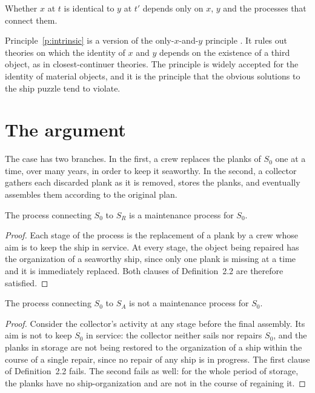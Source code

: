 \documentclass{situationist-preprint}
\begin{document}
\begin{principle}[Intrinsicness]\label{p:intrinsic}
Whether $x$ at $t$ is identical to $y$ at $t'$ depends only on $x$, $y$ and the processes that connect them.
\end{principle}

Principle~\ref{p:intrinsic} is a version of the only-$x$-and-$y$ principle \citep{Wiggins1980,Noonan1985}. It rules out theories on which the identity of $x$ and $y$ depends on the existence of a third object, as in closest-continuer theories. The principle is widely accepted for the identity of material objects, and it is the principle that the obvious solutions to the ship puzzle tend to violate.

\section{The argument}

The case has two branches. In the first, a crew replaces the planks of $S_0$ one at a time, over many years, in order to keep it seaworthy. In the second, a collector gathers each discarded plank as it is removed, stores the planks, and eventually assembles them according to the original plan.

\begin{lemma}\label{l:repair}
The process connecting $S_0$ to $S_R$ is a maintenance process for $S_0$.
\end{lemma}

\begin{proof}
Each stage of the process is the replacement of a plank by a crew whose aim is to keep the ship in service. At every stage, the object being repaired has the organization of a seaworthy ship, since only one plank is missing at a time and it is immediately replaced. Both clauses of Definition~2.2 are therefore satisfied.
\end{proof}

\begin{lemma}\label{l:assembly}
The process connecting $S_0$ to $S_A$ is not a maintenance process for $S_0$.
\end{lemma}

\begin{proof}
Consider the collector's activity at any stage before the final assembly. Its aim is not to keep $S_0$ in service: the collector neither sails nor repairs $S_0$, and the planks in storage are not being restored to the organization of a ship within the course of a single repair, since no repair of any ship is in progress. The first clause of Definition~2.2 fails. The second fails as well: for the whole period of storage, the planks have no ship-organization and are not in the course of regaining it.
\end{proof}
\end{document}
